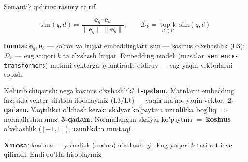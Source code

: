 \documentclass[aspectratio=169,11pt]{beamer}
\newcommand{\bunda}[1]{{\small\textbf{bunda:}\; #1}}
\begin{document}
\begin{frame}{Semantik qidiruv: rasmiy ta'rif}
  \begin{tcolorbox}[defbox,title={Ta'rif: kosinus o'xshashlik bilan top-k}]
    \vspace{-0.4em}
    $$ \mathrm{sim}(q, d) = \frac{\mathbf{e}_q \cdot \mathbf{e}_d}
        {\lVert \mathbf{e}_q\rVert\,\lVert \mathbf{e}_d\rVert}, \qquad
       \mathcal{D}_k = \operatorname*{top\text{-}k}_{d\in\mathcal{C}} \ \mathrm{sim}(q,d) $$
  \end{tcolorbox}
  \vspace{2pt}
  \bunda{$\mathbf{e}_q,\mathbf{e}_d$ --- so'rov va hujjat embeddinglari;
  $\mathrm{sim}$ --- kosinus o'xshashlik (L3); $\mathcal{D}_k$ --- eng yuqori
  $k$ ta o'xshash hujjat.}
  \vspace{4pt}
  \footnotesize Embedding modeli (masalan \texttt{sentence-transformers}) matnni
  vektorga aylantiradi; qidiruv --- eng yaqin vektorlarni topish.
\end{frame}

\begin{frame}{Keltirib chiqarish: nega kosinus o'xshashlik?}
  \textbf{1-qadam.} Matnlarni embedding fazosida vektor sifatida ifodalaymiz
  (L3/L6) --- yaqin ma'no, yaqin vektor.
  \pause
  \textbf{2-qadam.} Yaqinlikni o'lchash kerak: skalyar ko'paytma uzunlikka
  bog'liq $\Rightarrow$ normallashtiramiz.
  \pause
  \textbf{3-qadam.} Normallangan skalyar ko'paytma $=$ \textbf{kosinus}
  o'xshashlik ($[-1,1]$), uzunlikdan mustaqil.
  \begin{tcolorbox}[okbox,top=2pt,bottom=2pt]
    \small \textbf{Xulosa:} kosinus --- yo'nalish (ma'no) o'xshashligi.
    Eng yuqori $k$ tasi retrieve qilinadi. Endi qo'lda hisoblaymiz.
  \end{tcolorbox}
\end{frame}
\end{document}
